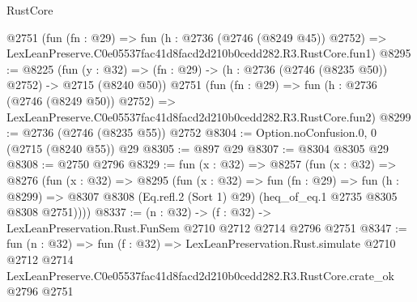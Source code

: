 \begin{lexlean}{RustCore}
\begin{coremodule}
    @2751
    (fun (fn : @29) =>
    fun (h : @2736 (@2746 (@8249 @45)) @2752) =>
    LexLeanPreserve.C0e05537fac41d8facd2d210b0cedd282.R3.RustCore.fun1)
@8295 := @8225
    (fun (y : @32) => (fn : @29) -> (h : @2736 (@2746 (@8235 @50)) @2752) -> @2715 (@8240 @50))
    @2751
    (fun (fn : @29) =>
    fun (h : @2736 (@2746 (@8249 @50)) @2752) =>
    LexLeanPreserve.C0e05537fac41d8facd2d210b0cedd282.R3.RustCore.fun2)
@8299 := @2736 (@2746 (@8235 @55)) @2752
@8304 := Option.noConfusion.{0, 0} (@2715 (@8240 @55)) @29
@8305 := @897 @29
@8307 := @8304 @8305 @29
@8308 := @2750 @2796
@8329 := fun (x : @32) =>
  @8257
    (fun (x : @32) =>
    @8276
      (fun (x : @32) =>
      @8295
        (fun (x : @32) =>
        fun (fn : @29) =>
        fun (h : @8299) =>
        @8307 @8308 (Eq.refl.{2} (Sort 1) @29) (heq_of_eq.{1} @2735 @8305 @8308 @2751))))
@8337 := (n : @32) -> (f : @32) -> LexLeanPreservation.Rust.FunSem @2710 @2712 @2714 @2796 @2751
@8347 := fun (n : @32) =>
  fun (f : @32) =>
  LexLeanPreservation.Rust.simulate
    @2710
    @2712
    @2714
    LexLeanPreserve.C0e05537fac41d8facd2d210b0cedd282.R3.RustCore.crate_ok
    @2796
    @2751
\end{coremodule}
\end{lexlean}
